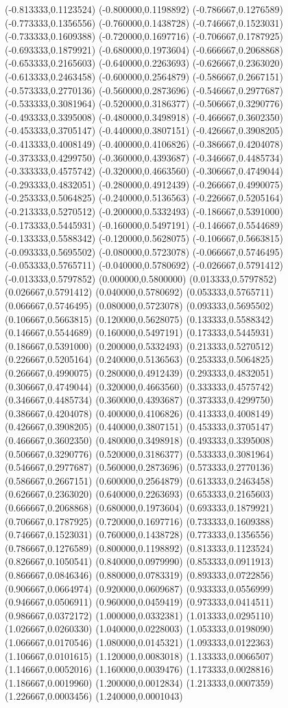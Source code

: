 \begin{solution}
{(-0.813333,0.1123524) (-0.800000,0.1198892) (-0.786667,0.1276589) (-0.773333,0.1356556) (-0.760000,0.1438728) (-0.746667,0.1523031) (-0.733333,0.1609388) (-0.720000,0.1697716) (-0.706667,0.1787925) (-0.693333,0.1879921) (-0.680000,0.1973604) (-0.666667,0.2068868) (-0.653333,0.2165603) (-0.640000,0.2263693) (-0.626667,0.2363020) (-0.613333,0.2463458) (-0.600000,0.2564879) (-0.586667,0.2667151) (-0.573333,0.2770136) (-0.560000,0.2873696) (-0.546667,0.2977687) (-0.533333,0.3081964) (-0.520000,0.3186377) (-0.506667,0.3290776) (-0.493333,0.3395008) (-0.480000,0.3498918) (-0.466667,0.3602350) (-0.453333,0.3705147) (-0.440000,0.3807151) (-0.426667,0.3908205) (-0.413333,0.4008149) (-0.400000,0.4106826) (-0.386667,0.4204078) (-0.373333,0.4299750) (-0.360000,0.4393687) (-0.346667,0.4485734) (-0.333333,0.4575742) (-0.320000,0.4663560) (-0.306667,0.4749044) (-0.293333,0.4832051) (-0.280000,0.4912439) (-0.266667,0.4990075) (-0.253333,0.5064825) (-0.240000,0.5136563) (-0.226667,0.5205164) (-0.213333,0.5270512) (-0.200000,0.5332493) (-0.186667,0.5391000) (-0.173333,0.5445931) (-0.160000,0.5497191) (-0.146667,0.5544689) (-0.133333,0.5588342) (-0.120000,0.5628075) (-0.106667,0.5663815) (-0.093333,0.5695502) (-0.080000,0.5723078) (-0.066667,0.5746495) (-0.053333,0.5765711) (-0.040000,0.5780692) (-0.026667,0.5791412) (-0.013333,0.5797852) (0.000000,0.5800000) (0.013333,0.5797852) (0.026667,0.5791412) (0.040000,0.5780692) (0.053333,0.5765711) (0.066667,0.5746495) (0.080000,0.5723078) (0.093333,0.5695502) (0.106667,0.5663815) (0.120000,0.5628075) (0.133333,0.5588342) (0.146667,0.5544689) (0.160000,0.5497191) (0.173333,0.5445931) (0.186667,0.5391000) (0.200000,0.5332493) (0.213333,0.5270512) (0.226667,0.5205164) (0.240000,0.5136563) (0.253333,0.5064825) (0.266667,0.4990075) (0.280000,0.4912439) (0.293333,0.4832051) (0.306667,0.4749044) (0.320000,0.4663560) (0.333333,0.4575742) (0.346667,0.4485734) (0.360000,0.4393687) (0.373333,0.4299750) (0.386667,0.4204078) (0.400000,0.4106826) (0.413333,0.4008149) (0.426667,0.3908205) (0.440000,0.3807151) (0.453333,0.3705147) (0.466667,0.3602350) (0.480000,0.3498918) (0.493333,0.3395008) (0.506667,0.3290776) (0.520000,0.3186377) (0.533333,0.3081964) (0.546667,0.2977687) (0.560000,0.2873696) (0.573333,0.2770136) (0.586667,0.2667151) (0.600000,0.2564879) (0.613333,0.2463458) (0.626667,0.2363020) (0.640000,0.2263693) (0.653333,0.2165603) (0.666667,0.2068868) (0.680000,0.1973604) (0.693333,0.1879921) (0.706667,0.1787925) (0.720000,0.1697716) (0.733333,0.1609388) (0.746667,0.1523031) (0.760000,0.1438728) (0.773333,0.1356556) (0.786667,0.1276589) (0.800000,0.1198892) (0.813333,0.1123524) (0.826667,0.1050541) (0.840000,0.0979990) (0.853333,0.0911913) (0.866667,0.0846346) (0.880000,0.0783319) (0.893333,0.0722856) (0.906667,0.0664974) (0.920000,0.0609687) (0.933333,0.0556999) (0.946667,0.0506911) (0.960000,0.0459419) (0.973333,0.0414511) (0.986667,0.0372172) (1.000000,0.0332381) (1.013333,0.0295110) (1.026667,0.0260330) (1.040000,0.0228003) (1.053333,0.0198090) (1.066667,0.0170546) (1.080000,0.0145321) (1.093333,0.0122363) (1.106667,0.0101615) (1.120000,0.0083018) (1.133333,0.0066507) (1.146667,0.0052016) (1.160000,0.0039476) (1.173333,0.0028816) (1.186667,0.0019960) (1.200000,0.0012834) (1.213333,0.0007359) (1.226667,0.0003456) (1.240000,0.0001043) }
\end{solution}
